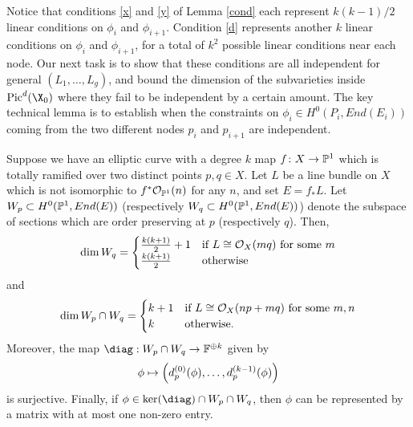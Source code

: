  Notice that conditions \eqref{x} and \eqref{y} of Lemma \ref{cond}  each represent $k(k-1)/2$ linear conditions on $\phi_i$ and $\phi_{i+1}$. Condition \eqref{d} represents another $k$ linear conditions on $\phi_i$ and $\phi_{i+1}$, for a total of $k^2$ possible linear conditions near each node. Our next task is to show that these conditions are all independent for general $(L_1, \ldots, L_g)$, and bound the dimension of the subvarieties inside $\Pic^d(\X_0)$ where they fail to be independent by a certain amount.
 The key technical lemma is to establish when the constraints on $\phi_i \in H^0(P_i, End(E_i))$ coming from the two different nodes $p_i$ and $p_{i+1}$ are independent.

 \begin{Lemma}
\notready \label{zing}
Suppose we have an elliptic curve with a degree $k$ map $f\colon  X \rightarrow \mathbb{P}^1$ which is totally ramified over two distinct points $p, q \in X$. Let $L$ be a line bundle on $X$ which is not isomorphic to $f^*\mathcal{O}_{\mathbb{P}^1}(n)$ for any $n$, and set $E = f_*L$.
 Let $W_p \subset H^0(\mathbb{P}^1,End(E))$ (respectively $W_q \subset H^0(\mathbb{P}^1, End(E))$) denote the subspace of sections which are order preserving at $p$ (respectively $q$).
 Then,
 \[\dim W_q = \begin{cases} \frac{k(k+1)}{2} + 1 & \text{if $L \cong \mathcal{O}_X(mq)$ for some $m$} \\ \frac{k(k+1)}{2} & \text{otherwise}\end{cases}\]
 and
 \[\dim W_p \cap W_q = \begin{cases} k+1 & \text{if $L \cong \mathcal{O}_X(n p+ m q)$ for some $m, n$} \\ k & \text{otherwise}. \end{cases} \]
 Moreover, the map $\diag: W_p \cap W_q \rightarrow \cc^{\oplus k}$ given by
 \begin{equation} \label{map}\dcref{3.5}
\source{refined-brill-noether-theory-hurwitz-spaces}
 \phi \mapsto \left(d_{p}^{(0)}(\phi), \ldots, d_{p}^{(k-1)}(\phi)\right)
 \end{equation}
 is surjective. Finally, if $\phi \in \ker(\diag) \cap W_p \cap W_q$, then $\phi$ can be represented by a matrix with at most one non-zero entry.
 \end{Lemma}
